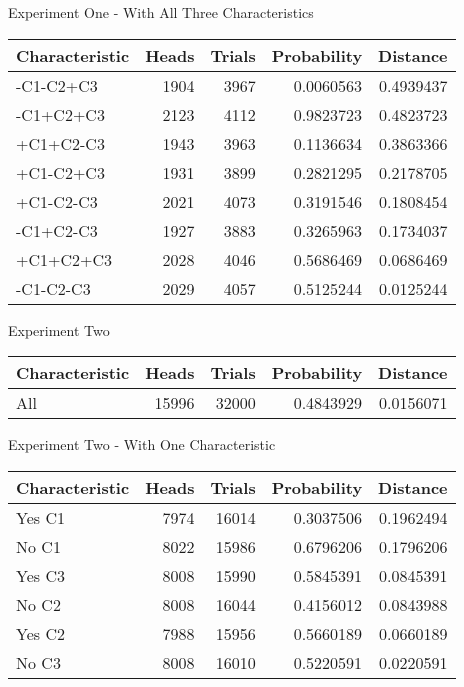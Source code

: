 \documentclass[
  ignorenonframetext,
]{beamer}
\renewcommand{\,}{\text{, }}
\begin{document}
\begin{frame}{Experiment One - With All Three Characteristics}
\protect\hypertarget{experiment-one---with-all-three-characteristics}{}

\begin{longtable}[]{@{}lrrrr@{}}
\toprule
Characteristic & Heads & Trials & Probability & Distance\tabularnewline
\midrule
\endhead
-C1-C2+C3 & 1904 & 3967 & 0.0060563 & 0.4939437\tabularnewline
-C1+C2+C3 & 2123 & 4112 & 0.9823723 & 0.4823723\tabularnewline
+C1+C2-C3 & 1943 & 3963 & 0.1136634 & 0.3863366\tabularnewline
+C1-C2+C3 & 1931 & 3899 & 0.2821295 & 0.2178705\tabularnewline
+C1-C2-C3 & 2021 & 4073 & 0.3191546 & 0.1808454\tabularnewline
-C1+C2-C3 & 1927 & 3883 & 0.3265963 & 0.1734037\tabularnewline
+C1+C2+C3 & 2028 & 4046 & 0.5686469 & 0.0686469\tabularnewline
-C1-C2-C3 & 2029 & 4057 & 0.5125244 & 0.0125244\tabularnewline
\bottomrule
\end{longtable}

\end{frame}

\begin{frame}{Experiment Two}
\protect\hypertarget{experiment-two}{}

\begin{longtable}[]{@{}lrrrr@{}}
\toprule
Characteristic & Heads & Trials & Probability & Distance\tabularnewline
\midrule
\endhead
All & 15996 & 32000 & 0.4843929 & 0.0156071\tabularnewline
\bottomrule
\end{longtable}

\end{frame}

\begin{frame}{Experiment Two - With One Characteristic}
\protect\hypertarget{experiment-two---with-one-characteristic}{}

\begin{longtable}[]{@{}lrrrr@{}}
\toprule
Characteristic & Heads & Trials & Probability & Distance\tabularnewline
\midrule
\endhead
Yes C1 & 7974 & 16014 & 0.3037506 & 0.1962494\tabularnewline
No C1 & 8022 & 15986 & 0.6796206 & 0.1796206\tabularnewline
Yes C3 & 8008 & 15990 & 0.5845391 & 0.0845391\tabularnewline
No C2 & 8008 & 16044 & 0.4156012 & 0.0843988\tabularnewline
Yes C2 & 7988 & 15956 & 0.5660189 & 0.0660189\tabularnewline
No C3 & 8008 & 16010 & 0.5220591 & 0.0220591\tabularnewline
\bottomrule
\end{longtable}

\end{frame}
\end{document}
